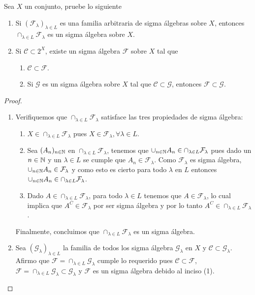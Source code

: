 \begin{statement}{3}
  Sea $X$ un conjunto, pruebe lo siguiente
  \begin{enumerate}
    \item Si $(\mathcal{F}_{\lambda})_{\lambda \in L}$ es una familia arbitraria de sigma \'algebras sobre $X$, entonces $\cap_{\lambda \in L} \mathcal{F}_{\lambda}$ es un sigma \'algebra sobre $X$.
    \item Si $\mathcal{C} \subset 2^X$, existe un sigma \'algebra $\mathcal{F}$ sobre $X$ tal que
      \begin{enumerate}
        \item $\mathcal{C} \subset \mathcal{F}$.
        \item Si $\mathcal{G}$ es un sigma \'algebra sobre $X$ tal que $\mathcal{C} \subset \mathcal{G}$, entonces $\mathcal{F} \subset \mathcal{G}$.
      \end{enumerate}
  \end{enumerate}
\end{statement}

\begin{proof}
  \begin{enumerate}
    \item Verifiquemos que $\cap_{\lambda \in L} \mathcal{F}_{\lambda}$ satisface las tres propiedades de sigma \'algebra:
      \begin{enumerate}
        \item $X \in \cap_{\lambda \in L} \mathcal{F}_{\lambda}$ pues $X \in \mathcal{F}_{\lambda}, \forall \lambda \in L$.
        \item Sea $(A_n)_{n \in \mathbb N}$ en $\cap_{\lambda \in L} \mathcal{F}_{\lambda}$, tenemos que $\cup_{n \in \mathbb N} A_n \in \cap_{\lambda \in L} \mathcal{F}_{\lambda}$ pues dado un $n \in \mathbb N$ y un $\lambda \in L$ se cumple que $A_n \in \mathcal{F}_{\lambda}$. Como $\mathcal{F}_{\lambda}$ es sigma \'algebra, $\cup_{n \in \mathbb N} A_n \in \mathcal{F}_{\lambda}$ y como esto es cierto para todo $\lambda$ en $L$ entonces $\cup_{n \in \mathbb N} A_n \in \cap_{\lambda \in L} \mathcal{F}_{\lambda}$.
        \item Dado $A \in \cap_{\lambda \in L} \mathcal{F}_{\lambda}$, para todo $\lambda \in L$ tenemos que $A \in \mathcal{F}_{\lambda}$, lo cual implica que $A^C \in \mathcal{F}_{\lambda}$ por ser sigma \'algebra y por lo tanto $A^C \in \cap_{\lambda \in L} \mathcal{F}_{\lambda}$.
      \end{enumerate}
      Finalmente, concluimos que $\cap_{\lambda \in L} \mathcal{F}_{\lambda}$ es un sigma \'algebra.
    \item Sea $(\mathcal{G}_{\lambda})_{\lambda \in L}$ la familia de todos los sigma \'algebra $\mathcal{G}_{\lambda}$ en $X$ y $\mathcal{C} \subset \mathcal{G}_{\lambda}$. Afirmo que $\mathcal{F} = \cap_{\lambda \in L} \mathcal{G}_{\lambda}$ cumple lo requerido pues $\mathcal{C} \subset \mathcal{F}$, $\mathcal{F} = \cap_{\lambda \in L} \mathcal{G}_{\lambda} \subset \mathcal{G}_{\lambda}$ y $\mathcal{F}$ es un sigma \'algebra debido al inciso (1).
  \end{enumerate}
\end{proof}

